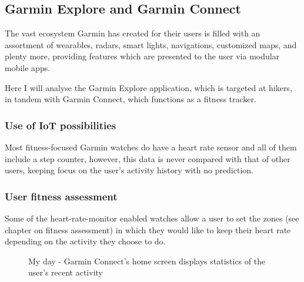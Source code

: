 \subsection{Garmin Explore and Garmin Connect}
The vast ecosystem Garmin has created for their users is filled with an assortment of wearables, radars, smart lights, navigations, customized maps, and plenty more, providing features which are presented to the user via modular mobile apps.

Here I will analyse the Garmin Explore application, which is targeted at hikers, in tandem with Garmin Connect, which functions as a fitness tracker.

\subsubsection*{Use of IoT possibilities}
Most fitness-focused Garmin watches do have a heart rate sensor and all of them include a step counter, however, this data is never compared with that of other users, keeping focus on the user's activity history with no prediction.
\subsubsection*{User fitness assessment}
Some of the heart-rate-monitor enabled watches allow a user to set the zones (see chapter on fitness assessment) in which they would like to keep their heart rate depending on the activity they choose to do.

\begin{figure}[h]
    \centering
        \caption{My day - Garmin Connect's home screen displays statistics of the user's recent activity\cite{garmin-my-day-img}}
        \label{garmin-my-day-img}
\end{figure}

